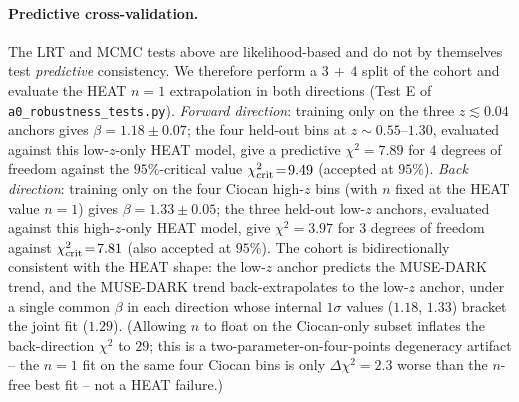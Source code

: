 \documentclass[twocolumn,letterpaper]{aastex631}
\begin{document}
\paragraph{Predictive cross-validation.}  The LRT and MCMC tests
above are likelihood-based and do not by themselves test
\emph{predictive} consistency.  We therefore perform a
$3\,{+}\,4$ split of the cohort and evaluate the HEAT
$n\!=\!1$ extrapolation in both directions (Test E of
\texttt{a0\_robustness\_tests.py}).
\textit{Forward direction}: training only on the three $z\!\lesssim\!0.04$
anchors gives $\beta\!=\!1.18\!\pm\!0.07$; the four held-out
\citet{Ciocan2026RAR} bins at $z\!\sim\!0.55$--$1.30$, evaluated
against this low-$z$-only HEAT model, give a predictive
$\chi^{2}\!=\!7.89$ for $4$ degrees of freedom against the
$95\%$-critical value $\chi^{2}_{\rm crit}\!=\!9.49$
(accepted at $95\%$).  \textit{Back direction}: training only on
the four Ciocan high-$z$ bins (with $n$ fixed at the HEAT value
$n\!=\!1$) gives $\beta\!=\!1.33\!\pm\!0.05$; the three held-out
low-$z$ anchors, evaluated against this high-$z$-only HEAT
model, give $\chi^{2}\!=\!3.97$ for $3$ degrees of freedom
against $\chi^{2}_{\rm crit}\!=\!7.81$ (also accepted at
$95\%$).  The cohort is bidirectionally consistent with the
HEAT shape: the low-$z$ anchor predicts the MUSE-DARK trend,
and the MUSE-DARK trend back-extrapolates to the low-$z$ anchor,
under a single common $\beta$ in each direction whose internal
$1\sigma$ values ($1.18$, $1.33$) bracket the joint fit
($1.29$).  (Allowing $n$ to float on the Ciocan-only subset
inflates the back-direction $\chi^{2}$ to $29$; this is a
two-parameter-on-four-points degeneracy artifact -- the
$n\!=\!1$ fit on the same four Ciocan bins is only
$\Delta\chi^{2}\!=\!2.3$ worse than the $n$-free best fit --
not a HEAT failure.)
\end{document}
